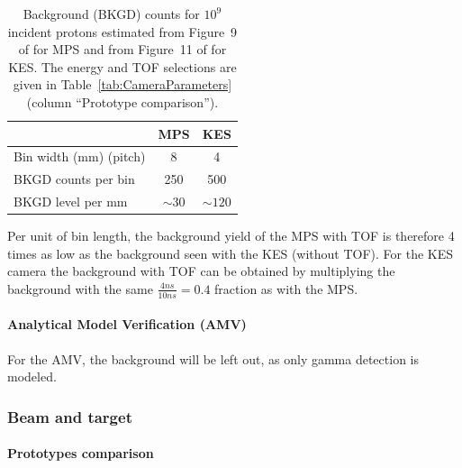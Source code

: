 \documentclass[a4paper,english,12pt]{article}
\begin{document}
\begin{table}[h]
\centering		
\begin{tabular}{lcc}
	\toprule
													& MPS			& KES \\
	\midrule
	Bin width (mm) (pitch)	& 8				& 4 \\
	BKGD counts per bin			& 250			& 500 \\
	BKGD level per mm				& $\sim30$& $\sim120$ \\
	\bottomrule
\end{tabular}		
\caption{Background (BKGD) counts for $10^9$ incident protons estimated from Figure~9 of \cite{Pinto2014a} for MPS and from Figure~11 of \cite{Perali2014} for KES. The energy and TOF selections are given in Table~\ref{tab:CameraParameters} (column \enquote{Prototype comparison}).}
\label{tab:BKGD}
\end{table}		


Per unit of bin length, the background yield of the MPS with TOF is therefore 4 times as low as the background seen with the KES (without TOF). For the KES camera the background with TOF can be obtained by multiplying the background with the same $\frac{4 ns}{10 ns} = 0.4$ fraction as with the MPS. 

\paragraph{Analytical Model Verification (AMV)}

For the AMV, the background will be left out, as only gamma detection is modeled.

\subsubsection{Beam and target}

\paragraph{Prototypes comparison}
\end{document}
